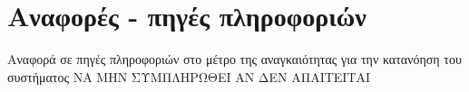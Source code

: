 \section{Αναφορές - πηγές πληροφοριών}
Αναφορά σε πηγές πληροφοριών στο μέτρο της αναγκαιότητας για την κατανόηση του συστήματος
ΝΑ ΜΗΝ ΣΥΜΠΛΗΡΩΘΕΙ ΑΝ ΔΕΝ ΑΠΑΙΤΕΙΤΑΙ